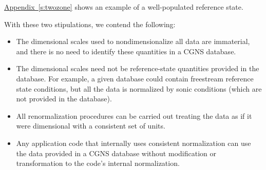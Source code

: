 \hyperref[s:twozone]{Appendix~\ref*{s:twozone}} shows an example of a
well-populated reference state.

With these two stipulations, we contend the following:
\begin{itemize}
\item
The dimensional scales used to nondimensionalize all data are
immaterial, and there is no need to identify these quantities in a CGNS
database.
\item
The dimensional scales need not be reference-state quantities provided
in the database.  For example, a given database could contain freestream
reference state conditions, but all the data is normalized by sonic
conditions (which are not provided in the database).
\item
All renormalization procedures can be carried out treating the data as if
it were dimensional with a consistent set of units.
\item
Any application code that internally uses consistent normalization
can use the data provided in a CGNS database without modification or
transformation to the code's internal normalization.
\end{itemize}

